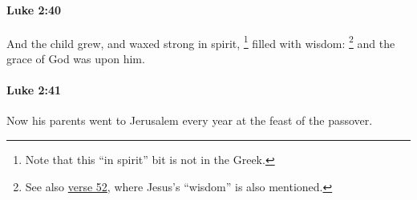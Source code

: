 		\paragraph{Luke 2:40} %
			\label{LUKE-2-40}

			And the child grew, and waxed strong in spirit,%
				\footnote{%
					Note that this ``in spirit'' bit is not in the Greek.
					}
			filled with wisdom:%
				\footnote{%
					See also \hyperref[LUKE-2-52]{verse 52}, where Jesus's ``wisdom'' is also mentioned.
					}
			and the grace of God was upon him.

			\begin{framed}
			\scriptsize
				\begin{compactdesc}
					\item[SBLG] 
				\end{compactdesc}
			\end{framed}

		\paragraph{Luke 2:41} %
			\label{LUKE-2-41}

			Now his parents went to Jerusalem every year at the feast of the passover.

